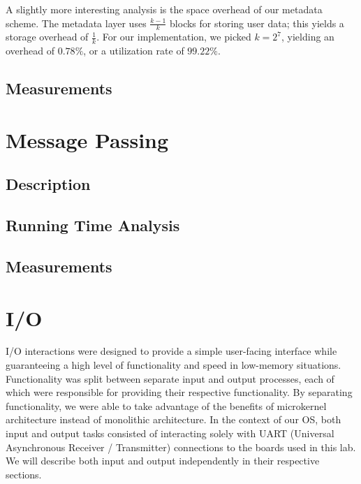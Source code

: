 \documentclass[12pt]{report}
\begin{document}
    A slightly more interesting analysis is the space overhead of our metadata
    scheme. The metadata layer uses $\frac{k-1}{k}$ blocks for storing user
    data; this yields a storage overhead of $\frac{1}{k}$. For our
    implementation, we picked $k=2^7$, yielding an overhead of $0.78\%$, or a
    utilization rate of $99.22\%$.

\section{Measurements}

\chapter{Message Passing}

\section{Description}

\section{Running Time Analysis}

\section{Measurements}

\chapter{I/O}

    I/O interactions were designed to provide a simple user-facing interface
    while guaranteeing a high level of functionality and speed in low-memory
    situations. Functionality was split between separate input and output
    processes, each of which were responsible for providing their respective
    functionality. By separating functionality, we were able to take advantage
    of the benefits of microkernel architecture instead of monolithic
    architecture.
    In the context of our OS, both input and output tasks consisted of %
    interacting solely with UART (Universal Asynchronous Receiver / Transmitter)
    connections to the boards used in this lab.
    We will describe both input and output independently in their respective
    sections.
\end{document}
